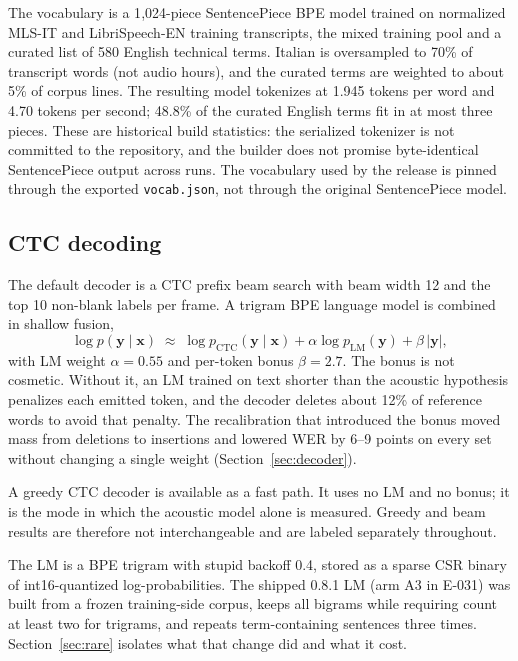 \documentclass{article}
\begin{document}
The vocabulary is a 1{,}024-piece SentencePiece BPE model \citep{kudo2018sentencepiece} trained on
normalized MLS-IT and LibriSpeech-EN training transcripts, the mixed training pool and a curated
list of 580 English technical terms. Italian is oversampled to 70\% of transcript words (not audio
hours), and the curated terms are weighted to about 5\% of corpus lines. The resulting model
tokenizes at 1.945 tokens per word and 4.70 tokens per second; 48.8\% of the curated English terms
fit in at most three pieces. These are historical build statistics: the serialized tokenizer is
not committed to the repository, and the builder does not promise byte-identical SentencePiece
output across runs. The vocabulary used by the release is pinned through the exported
\texttt{vocab.json}, not through the original SentencePiece model.

\subsection{CTC decoding}

The default decoder is a CTC prefix beam search \citep{graves2012sequence} with beam width 12 and
the top 10 non-blank labels per frame. A trigram BPE language model is combined in shallow fusion,
\begin{equation}
  \log p(\mathbf{y}\mid\mathbf{x}) \;\approx\;
  \log p_{\mathrm{CTC}}(\mathbf{y}\mid\mathbf{x})
  + \alpha \log p_{\mathrm{LM}}(\mathbf{y})
  + \beta\,|\mathbf{y}| ,
\end{equation}
with LM weight $\alpha=0.55$ and per-token bonus $\beta=2.7$. The bonus is not cosmetic. Without
it, an LM trained on text shorter than the acoustic hypothesis penalizes each emitted token, and
the decoder deletes about 12\% of reference words to avoid that penalty. The recalibration that
introduced the bonus moved mass from deletions to insertions and lowered WER by 6--9 points on
every set without changing a single weight (Section~\ref{sec:decoder}).

A greedy CTC decoder is available as a fast path. It uses no LM and no bonus; it is the mode in
which the acoustic model alone is measured. Greedy and beam results are therefore not
interchangeable and are labeled separately throughout.

The LM is a BPE trigram with stupid backoff 0.4, stored as a sparse CSR binary of int16-quantized
log-probabilities. The shipped 0.8.1 LM (arm A3 in E-031) was built from a frozen training-side corpus, keeps all
bigrams while requiring count at least two for trigrams, and repeats term-containing sentences three times.
Section~\ref{sec:rare} isolates what that change did and what it cost.
\end{document}

